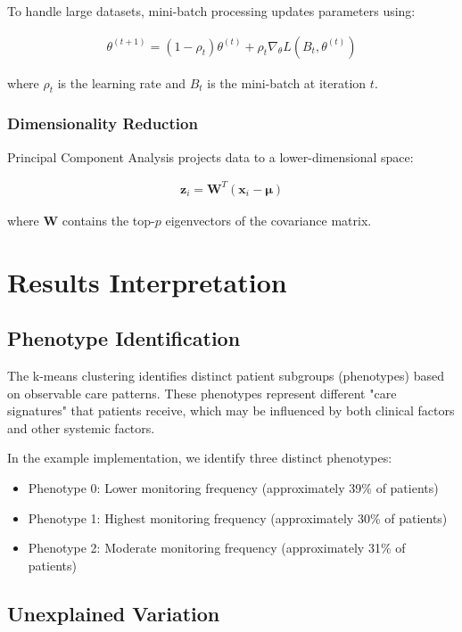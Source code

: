 \documentclass[12pt]{article}
\begin{document}
To handle large datasets, mini-batch processing updates parameters using:

\begin{align}
\theta^{(t+1)} = (1-\rho_t)\theta^{(t)} + \rho_t \nabla_{\theta} L(B_t, \theta^{(t)})
\end{align}

where $\rho_t$ is the learning rate and $B_t$ is the mini-batch at iteration $t$.

\subsubsection{Dimensionality Reduction}

Principal Component Analysis projects data to a lower-dimensional space:

\begin{align}
\mathbf{z}_i = \mathbf{W}^T(\mathbf{x}_i - \boldsymbol{\mu})
\end{align}

where $\mathbf{W}$ contains the top-$p$ eigenvectors of the covariance matrix.

\section{Results Interpretation}

\subsection{Phenotype Identification}

The k-means clustering identifies distinct patient subgroups (phenotypes) based on observable care patterns. These phenotypes represent different "care signatures" that patients receive, which may be influenced by both clinical factors and other systemic factors.

In the example implementation, we identify three distinct phenotypes:
\begin{itemize}
    \item Phenotype 0: Lower monitoring frequency (approximately 39\% of patients)
    \item Phenotype 1: Highest monitoring frequency (approximately 30\% of patients)
    \item Phenotype 2: Moderate monitoring frequency (approximately 31\% of patients)
\end{itemize}

\subsection{Unexplained Variation}
\end{document}

